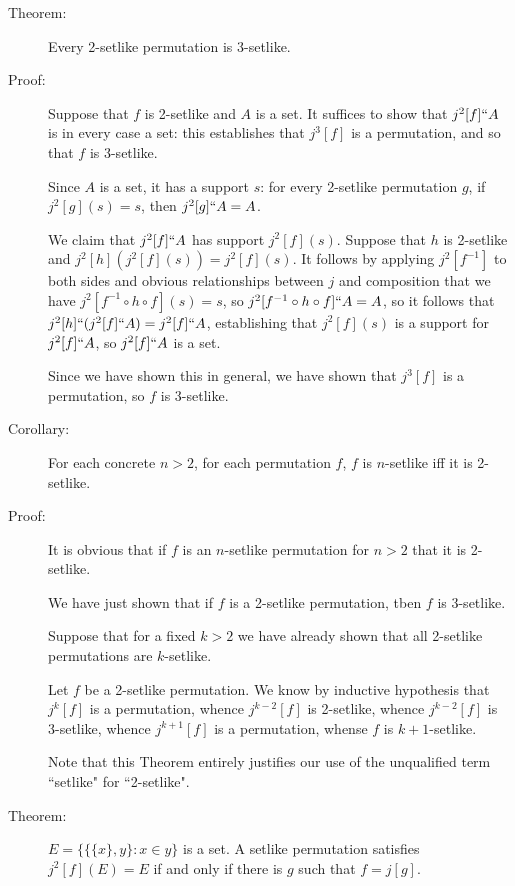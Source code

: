 \documentclass[12pt]{article}
\begin{document}
\begin{description}

\item[Theorem:]  Every 2-setlike permutation is 3-setlike.

\item[Proof:]  Suppose that $f$ is 2-setlike and $A$ is a set.  It suffices to show that $j^2[f]``A$ is in every case a set:  this establishes
that $j^3[f]$ is a permutation, and so that $f$ is 3-setlike.

Since $A$ is a set, it has a support $s$:  for every 2-setlike permutation $g$, if $j^2[g](s)=s$, then $j^2[g]``A=A$.  

We claim
that $j^2[f]``A$ has support $j^2[f](s)$.   Suppose that $h$ is 2-setlike and $j^2[h](j^2[f](s)) = j^2[f](s)$.  It follows
by applying $j^2[f^{-1}]$ to both sides and obvious relationships between $j$ and composition that we have $j^2[f^{-1} \circ h \circ f](s)=s$,
so  $j^2[f^{-1} \circ h \circ f]``A = A$, so it follows that $j^2[h]``(j^2[f]``A) = j^2[f]``A$, establishing that  $j^2[f](s)$ is a support for
$j^2[f]``A$, so $j^2[f]``A$ is a set.

Since we have shown this in general, we have shown that $j^3[f]$ is a permutation, so $f$ is 3-setlike.

\item[Corollary:]  For each concrete $n>2$, for each permutation $f$, $f$ is $n$-setlike iff it is 2-setlike.

\item[Proof:]  It is obvious that if $f$ is an $n$-setlike permutation for $n>2$ that it is 2-setlike.

We have just shown that if $f$ is a 2-setlike permutation, tben $f$ is 3-setlike.

Suppose that for a fixed $k>2$ we have already shown that all 2-setlike permutations are $k$-setlike.

Let $f$ be a 2-setlike permutation.  We know by inductive hypothesis that $j^k[f]$ is a permutation, whence $j^{k-2}[f]$ is 2-setlike,
whence $j^{k-2}[f]$ is 3-setlike, whence $j^{k+1}[f]$ is a permutation, whense $f$ is $k+1$-setlike.

Note that this Theorem entirely justifies our use of the unqualified term ``setlike" for ``2-setlike".

\item[Theorem:]  $E = \{\{\{x\},y\}:x \in y\}$ is a set.  A setlike permutation satisfies  $j^2[f](E)=E$ if and only if
there is $g$ such that $f=j[g]$.


\end{description}
\end{document}
